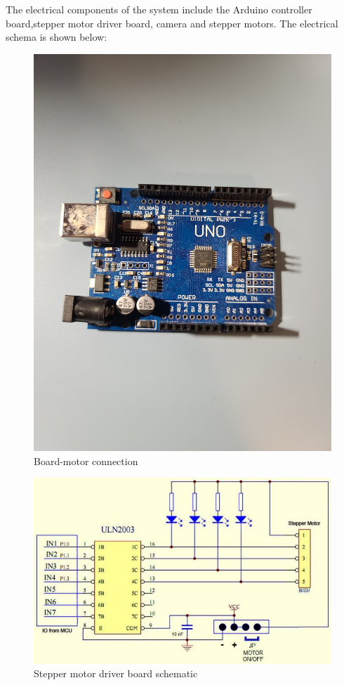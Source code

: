 \documentclass[12pt, titlepage]{article}
\begin{document}
The electrical components of the system include the Arduino controller board,stepper motor driver board, camera and stepper motors. The electrical schema is shown below:\\
\begin{figure}[H]
\caption{Board-motor connection}
\centering
\includegraphics[width=\textwidth]{board}
\end{figure}
\begin{figure}[H]
\caption{Stepper motor driver board schematic}
\centering
\includegraphics[width=\textwidth]{ULN2003}
\end{figure}
\end{document}
